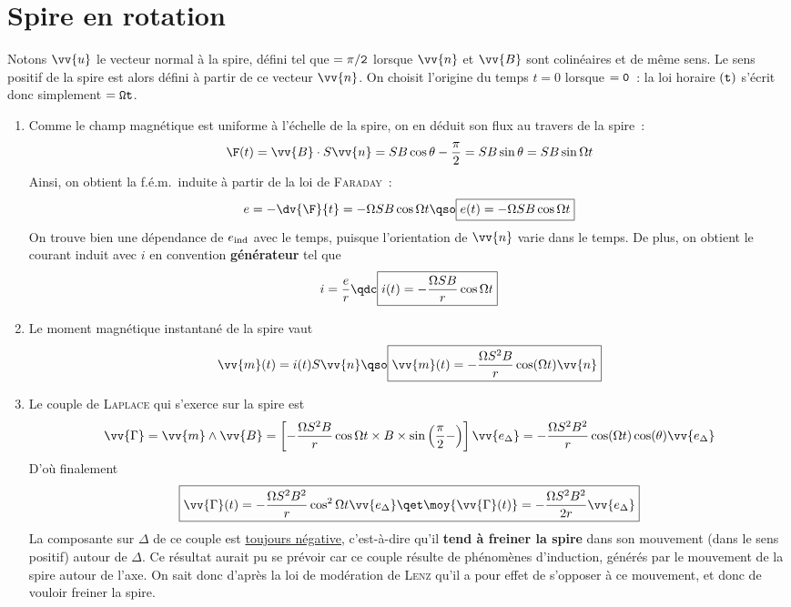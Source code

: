\documentclass[a4paper, 10pt, final, garamond]{book}
\begin{document}
\section{Spire en rotation}
\label{sec:spirotcorr}
Notons $\vv{u}$ le vecteur normal à la spire, défini tel que $\tt = \pi/2$
lorsque $\vv{n}$ et $\vv{B}$ sont colinéaires et de même sens. Le sens positif
de la spire est alors défini à partir de ce vecteur $\vv{n}$. On choisit
l'origine du temps $t = 0$ lorsque $\tt = 0$~: la loi horaire $\tt (t)$ s'écrit
donc simplement $\tt = \Omega t$.
\begin{enumerate}
	\item Comme le champ magnétique est uniforme à l'échelle de la spire, on en
	      déduit son flux au travers de la spire~:
	      \[
		      \F (t) = \vv{B}\cdot S \vv{n} = SB \cos{\theta - \frac{\pi}{2}} =
		      SB \sin{\theta} = SB \sin{\Omega t}
	      \]
	      Ainsi, on obtient la f.é.m.\ induite à partir de la loi de
	      \textsc{Faraday}~:
	      \[
		      e = - \dv{\F}{t} = -\Omega SB \cos{\Omega t}
		      \qso
		      \boxed{e(t) = -\Omega SB \cos{\Omega t}}
	      \]
	      On trouve bien une dépendance de $e_{\rm ind}$ avec le temps, puisque
	      l'orientation de $\vv{n}$ varie dans le temps. De plus, on obtient le
	      courant induit avec $i$ en convention \textbf{générateur} tel que
	      \[
		      i = \frac{e}{r}
		      \qdc
		      \boxed{i(t) = - \frac{\Omega SB}{r} \cos{\Omega t}}
	      \]
	\item Le moment magnétique instantané de la spire vaut
	      \[
		      \vv{m}(t) = i(t)S \vv{n}
		      \qso
		      \boxed{\vv{m}(t) = - \frac{\Omega S^2B}{r}\cos(\Omega t)\vv{n}}
	      \]
	\item Le couple de \textsc{Laplace} qui s'exerce sur la spire est
	      \[
		      \vv{\Gamma} = \vv{m}\wedge \vv{B} =
		      \left[ -\frac{\Omega S^2B}{r}\cos{\Omega t}
			      \times B \times \sin{\left( \frac{\pi}{2}-\tt \right)}
			      \right] \vv{e_{\Delta}}
		      = - \frac{\Omega S^2B^2}{r} \cos(\Omega t)\cos(\theta)\vv{e_{\Delta}}
	      \]
	      D'où finalement
	      \[
		      \boxed{
		      \vv{\Gamma}(t) = -\frac{\Omega S^2B^2}{r}
		      \cos^2{\Omega t} \vv{e_{\Delta}}
		      \qet
		      \moy{\vv{\Gamma}(t)} = - \frac{\Omega S^2B^2}{2r} \vv{e_{\Delta}}
		      }
	      \]
	      La composante sur $\Delta$ de ce couple est \ul{toujours négative},
	      c'est-à-dire qu'il \textbf{tend à freiner la spire} dans son mouvement
	      (dans le sens positif) autour de $\Delta$. Ce résultat aurait pu se
	      prévoir car ce couple résulte de phénomènes d'induction, générés par le
	      mouvement de la spire autour de l'axe. On sait donc d'après la loi de
	      modération de \textsc{Lenz} qu'il a pour effet de s'opposer à ce
	      mouvement, et donc de vouloir freiner la spire.
\end{enumerate}
\end{document}
